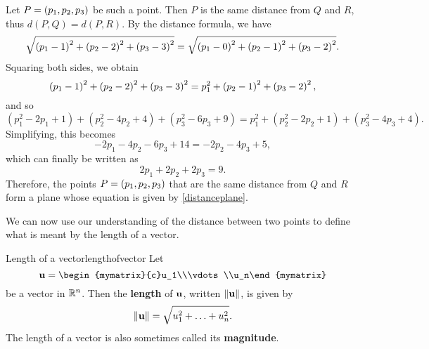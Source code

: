 \begin{solution}
  Let $P = \left(p_1,p_2,p_3\right)$ be such a point. Then $P$ is the same
  distance from $Q$ and $R$, thus $d(P,Q)=d(P,R)$. By the distance
  formula, we have
  \begin{equation*}
    \sqrt{\left(p_1-1\right)^{2}+\left(p_2-2\right)^{2}+\left(p_3-3\right)^{2}}=
    \sqrt{\left(p_1-0\right)^{2}+\left(p_2-1\right)^{2}+\left(p_3-2\right)^{2}}.
  \end{equation*}
  Squaring both sides, we obtain 
  \begin{equation*}
    \left(p_1 -1\right) ^{2}+\left(p_2 -2\right) ^{2}+\left(p_3 -3\right)
    ^{2}=p_1^{2}+\left(p_2-1\right) ^{2}+\left(p_3 -2\right) ^{2},
  \end{equation*}
  and so
  \begin{equation*}
    \allowbreak (p_1^{2}-2p_1+1)+(p_2^{2}-4p_2+4)+(p_3^{2}-6p_3+9)=p_1^{2}+(p_2^{2}-2p_2+1)+(p_3^{2}-4p_3+4).
  \end{equation*}
  Simplifying, this becomes
  \begin{equation*}
    -2p_1-4p_2-6p_3+14=-2p_2-4p_3+5,
  \end{equation*}
  which can finally be written as 
  \begin{equation}\label{distanceplane}
    2p_1+2p_2+2p_3=9.
  \end{equation}
  Therefore, the points $P = \left(p_1,p_2,p_3\right)$ that are the same
  distance from $Q$ and $R$ form a plane whose equation is given by
  \eqref{distanceplane}.
\end{solution}

We can now use our understanding of the distance between two points to
define what is meant by the length of a vector.

\begin{definition}{Length of a vector}{lengthofvector}
  Let
  \[
    \vect{u} = \begin{mymatrix}{c}u_1\\\vdots\\u_n\end{mymatrix}
  \]
  be a vector in $\mathbb{R}^n$. Then the
  \textbf{length} of
  $\mbox{\bf u}$, written $\left\|\mbox{\bf u}\right\|$, is given by
  \begin{equation*}
    \left\|\mbox{\bf u}\right\| = \sqrt{u_{1}^2 + \ldots + u_{n}^2}.
  \end{equation*}
  The length of a vector is also sometimes called its
  \textbf{magnitude}.
\end{definition}

